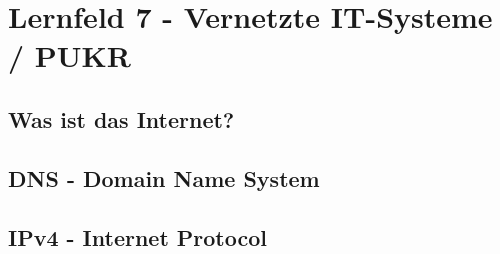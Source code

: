\section{Lernfeld 7 - Vernetzte IT-Systeme / PUKR} %


\subsection{Was ist das Internet?}


\subsection{DNS - Domain Name System}

\subsection{IPv4 - Internet Protocol}